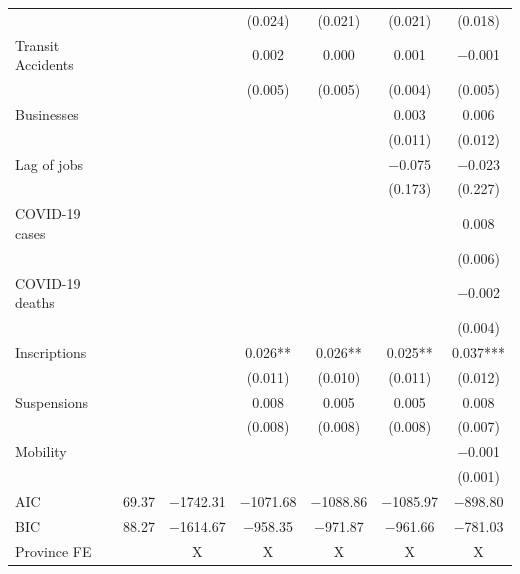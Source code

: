 \documentclass[11pt,a4paper]{article}\usepackage[]{graphicx}\usepackage[]{xcolor}
\begin{document}
\begin{table}[h]
\begin{tabular}[t]{lcccccc}
 &  &  & (\num{0.024}) & (\num{0.021}) & (\num{0.021}) & (\num{0.018})\\
Transit Accidents &  &  & \num{0.002} & \num{0.000} & \num{0.001} & \num{-0.001}\\
 &  &  & (\num{0.005}) & (\num{0.005}) & (\num{0.004}) & (\num{0.005})\\
Businesses &  &  &  &  & \num{0.003} & \num{0.006}\\
 &  &  &  &  & (\num{0.011}) & (\num{0.012})\\
Lag of jobs &  &  &  &  & \num{-0.075} & \num{-0.023}\\
 &  &  &  &  & (\num{0.173}) & (\num{0.227})\\
COVID-19 cases &  &  &  &  &  & \num{0.008}\\
 &  &  &  &  &  & (\num{0.006})\\
COVID-19 deaths &  &  &  &  &  & \num{-0.002}\\
 &  &  &  &  &  & (\num{0.004})\\
Inscriptions &  &  & \num{0.026}** & \num{0.026}** & \num{0.025}** & \num{0.037}***\\
 &  &  & (\num{0.011}) & (\num{0.010}) & (\num{0.011}) & (\num{0.012})\\
Suspensions &  &  & \num{0.008} & \num{0.005} & \num{0.005} & \num{0.008}\\
 &  &  & (\num{0.008}) & (\num{0.008}) & (\num{0.008}) & (\num{0.007})\\
Mobility &  &  &  &  &  & \num{-0.001}\\
 &  &  &  &  &  & (\num{0.001})\\
\midrule
AIC & \num{69.37} & \num{-1742.31} & \num{-1071.68} & \num{-1088.86} & \num{-1085.97} & \num{-898.80}\\
BIC & \num{88.27} & \num{-1614.67} & \num{-958.35} & \num{-971.87} & \num{-961.66} & \num{-781.03}\\
Province FE &  & X & X & X & X & X\\
\bottomrule
\end{tabular}


\end{table}
\end{document}

